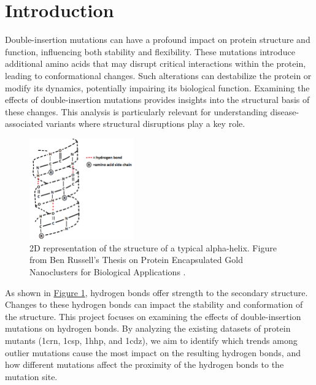 \documentclass[sigconf, screen, authorversion, authoraddress=false, oneside]{acmart}
\begin{document}
\section{Introduction}
Double-insertion mutations can have a profound impact on protein structure and function, influencing both stability and flexibility. These mutations introduce additional amino acids that may disrupt critical interactions within the protein, leading to conformational changes. Such alterations can destabilize the protein or modify its dynamics, potentially impairing its biological function. Examining the effects of double-insertion mutations provides insights into the structural basis of these changes. This analysis is particularly relevant for understanding disease-associated variants where structural disruptions play a key role.

\begin{figure}[ht]
    \centering
    \includegraphics[width=0.4\textwidth]{hbond_structure_crop.png} %
    \caption{2D representation of the structure of a typical alpha-helix. Figure from Ben Russell's Thesis on Protein Encapsulated Gold Nanoclusters for Biological Applications \cite{phdthesis}.}
    \label{fig:Figure1}
\end{figure}

As shown in \hyperref[fig:Figure1]{Figure 1}, hydrogen bonds \cite{ArunanDesirajuKleinSadlejScheinerAlkortaClaryCrabtreeDannenbergHobzaKjaergaardLegonMennucciNesbitt+2011+1619+1636} offer strength to the secondary structure. Changes to these hydrogen bonds can impact the stability and conformation of the structure. This project focuses on examining the effects of double-insertion mutations on hydrogen bonds. By analyzing the existing datasets of protein mutants (1crn, 1csp, 1hhp, and 1cdz), we aim to identify which trends among outlier mutations cause the most impact on the resulting hydrogen bonds, and how different mutations affect the proximity of the hydrogen bonds to the mutation site.
\end{document}
